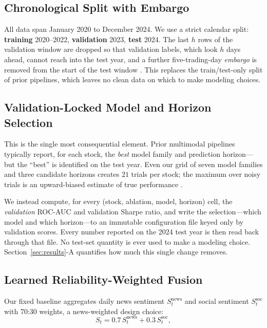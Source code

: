 \documentclass[conference]{IEEEtran}
\begin{document}
\subsection{Chronological Split with Embargo}
All data span January 2020 to December 2024. We use a strict calendar split:
\textbf{training} 2020--2022, \textbf{validation} 2023, \textbf{test} 2024. The
last $h$ rows of the validation window are dropped so that validation labels,
which look $h$ days ahead, cannot reach into the test year, and a further
five-trading-day \emph{embargo} is removed from the start of the test window
\cite{prado2018}. This replaces the train/test-only split of prior pipelines,
which leaves no clean data on which to make modeling choices.

\subsection{Validation-Locked Model and Horizon Selection}
This is the single most consequential element. Prior multimodal pipelines
typically report, for each stock, the \emph{best} model family and prediction
horizon---but the ``best'' is identified on the test year. Even our grid of
seven model families and three candidate horizons creates $21$ trials per
stock; the maximum over noisy trials is an upward-biased estimate of true
performance \cite{bailey2014dsr,harvey2016}.

We instead compute, for every (stock, ablation, model, horizon) cell, the
\emph{validation} ROC-AUC and validation Sharpe ratio, and write the
selection---which model and which horizon---to an immutable configuration file
keyed only by validation scores. Every number reported on the 2024 test year
is then read back through that file. No test-set quantity is ever used to make
a modeling choice. Section~\ref{sec:results}-A quantifies how much this single
change removes.

\subsection{Learned Reliability-Weighted Fusion}
Our fixed baseline aggregates daily news sentiment $S^{\text{news}}_t$ and social sentiment $S^{\text{soc}}_t$ with 70:30 weights, a news-weighted design choice:
\begin{equation}
S_t = 0.7\,S^{\text{news}}_t + 0.3\,S^{\text{soc}}_t, 
\label{eqn:fix-weight}
\end{equation}
\end{document}
